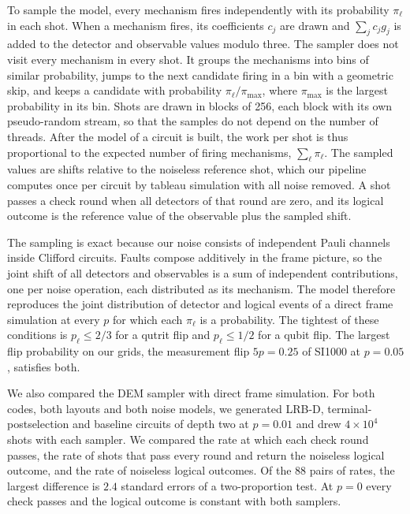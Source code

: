 To sample the model, every mechanism fires independently with its probability $\pi_\ell$ in each shot. When a mechanism fires, its coefficients $c_j$ are drawn and $\sum_j c_j g_j$ is added to the detector and observable values modulo three. The sampler does not visit every mechanism in every shot. It groups the mechanisms into bins of similar probability, jumps to the next candidate firing in a bin with a geometric skip, and keeps a candidate with probability $\pi_\ell / \pi_{\max}$, where $\pi_{\max}$ is the largest probability in its bin. Shots are drawn in blocks of 256, each block with its own pseudo-random stream, so that the samples do not depend on the number of threads. After the model of a circuit is built, the work per shot is thus proportional to the expected number of firing mechanisms, $\sum_\ell \pi_\ell$. The sampled values are shifts relative to the noiseless reference shot, which our pipeline computes once per circuit by tableau simulation with all noise removed. A shot passes a check round when all detectors of that round are zero, and its logical outcome is the reference value of the observable plus the sampled shift.

The sampling is exact because our noise consists of independent Pauli channels inside Clifford circuits. Faults compose additively in the frame picture, so the joint shift of all detectors and observables is a sum of independent contributions, one per noise operation, each distributed as its mechanism. The model therefore reproduces the joint distribution of detector and logical events of a direct frame simulation at every $p$ for which each $\pi_\ell$ is a probability. The tightest of these conditions is $p_\ell \le 2/3$ for a qutrit flip and $p_\ell \le 1/2$ for a qubit flip. The largest flip probability on our grids, the measurement flip $5p = 0.25$ of SI1000 at $p = 0.05$, satisfies both.

We also compared the DEM sampler with direct frame simulation. For both codes, both layouts and both noise models, we generated LRB-D, terminal-postselection and baseline circuits of depth two at $p = 0.01$ and drew $4 \times 10^4$ shots with each sampler. We compared the rate at which each check round passes, the rate of shots that pass every round and return the noiseless logical outcome, and the rate of noiseless logical outcomes. Of the 88 pairs of rates, the largest difference is $2.4$ standard errors of a two-proportion test. At $p = 0$ every check passes and the logical outcome is constant with both samplers.
